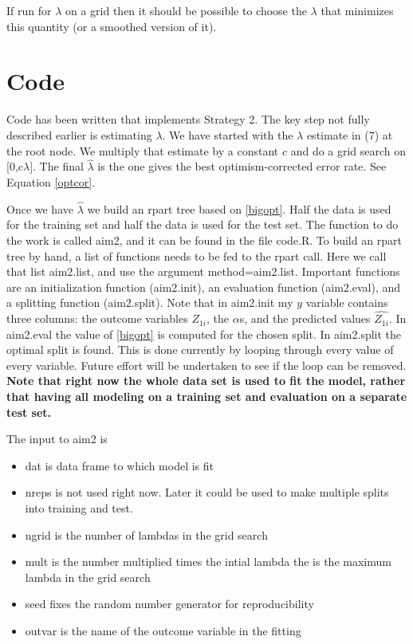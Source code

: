 \documentclass[12pt]{article}
\begin{document}
If run for $\lambda$ on a grid then it should be possible to choose 
the $\lambda$ that minimizes this quantity (or a smoothed version of it).

\section{Code}

Code has been written that implements Strategy 2.  The key step not
fully described earlier is estimating $\lambda$.  We have started with
the $\lambda$ estimate in (7) at the root node.  We multiply that
estimate by a constant $c$ and do a grid search on [0,c$\lambda$].
The final $\hat{\lambda}$ is the one gives the best optimism-corrected
error rate.  See Equation \eqref{optcor}.

Once we have $\hat{\lambda}$ we build an rpart tree based on
\eqref{bigopt}.  Half the data is used for the training set and half
the data is used for the test set.  The function to do the work is
called aim2, and it can be found in the file code.R.  To build an
rpart tree by hand, a list of functions needs to be fed to the rpart
call.  Here we call that list aim2.list, and use the argument
method=aim2.list.  Important functions are an initialization function
(aim2.init), an evaluation function (aim2.eval), and a splitting
function (aim2.split).  Note that in aim2.init my $y$ variable
contains three columns: the outcome variables $Z_{1i}$, the $\alpha$s,
and the predicted values $\widehat{Z_{1i}}$.  In aim2.eval the value
of \eqref{bigopt} is computed for the chosen split.  In aim2.split the
optimal split is found.  This is done currently by looping through
every value of every variable.  Future effort will be undertaken to
see if the loop can be removed.  {\bf Note that right now the whole
  data set is used to fit the model, rather that having all modeling
  on a training set and evaluation on a separate test set.}

The input to aim2 is
\begin{itemize}
\item dat is data frame to which model is fit
\item nreps is not used right now.  Later it could be used to make
  multiple splits into training and test.
\item ngrid is the number of lambdas in the grid search
\item mult is the number multiplied times the intial lambda the is the
  maximum lambda in the grid search
\item seed fixes the random number generator for reproducibility
\item outvar is the name of the outcome variable in the fitting
\end{itemize}  
\end{document}
